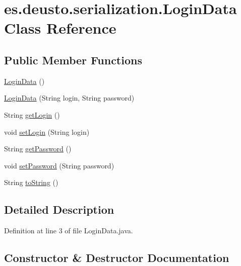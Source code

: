 \hypertarget{classes_1_1deusto_1_1serialization_1_1_login_data}{}\section{es.\+deusto.\+serialization.\+Login\+Data Class Reference}
\label{classes_1_1deusto_1_1serialization_1_1_login_data}
\subsection*{Public Member Functions}
\begin{DoxyCompactItemize}
\item 
\hyperlink{classes_1_1deusto_1_1serialization_1_1_login_data_adc1378ad932252951d270fb5c265b2a0}{Login\+Data} ()
\item 
\hyperlink{classes_1_1deusto_1_1serialization_1_1_login_data_a38ab50660ffb0b1283f825c463b94dd4}{Login\+Data} (String login, String password)
\item 
String \hyperlink{classes_1_1deusto_1_1serialization_1_1_login_data_a0e32fb64e6a069ddf5471b0ad9469e18}{get\+Login} ()
\item 
void \hyperlink{classes_1_1deusto_1_1serialization_1_1_login_data_affe30ee001271b2264106eeecc302882}{set\+Login} (String login)
\item 
String \hyperlink{classes_1_1deusto_1_1serialization_1_1_login_data_a39504f63e22c01e184427621c9b7cb12}{get\+Password} ()
\item 
void \hyperlink{classes_1_1deusto_1_1serialization_1_1_login_data_a8a744db82f9ddad859e04b6069502409}{set\+Password} (String password)
\item 
String \hyperlink{classes_1_1deusto_1_1serialization_1_1_login_data_a638424167a2321d58645b31fe9aef420}{to\+String} ()
\end{DoxyCompactItemize}


\subsection{Detailed Description}


Definition at line 3 of file Login\+Data.\+java.



\subsection{Constructor \& Destructor Documentation}
\mbox{\label{classes_1_1deusto_1_1serialization_1_1_login_data_adc1378ad932252951d270fb5c265b2a0}} 
